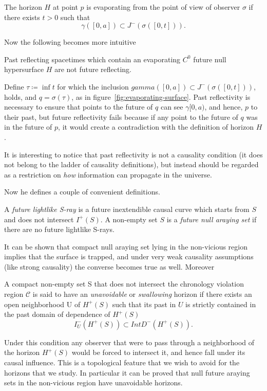 	\begin{definition}
		The horizon \(H\) at point \(p\) is evaporating from the point of view of observer \(\sigma\) if there exists \(t > 0\) such that
		\[
		\gamma \left([0, a]\right) \subset J^-\left(\sigma\left([0, t]\right)\right).	
		\] 
	\end{definition}
	Now the following becomes more intuitive
	\begin{theorem}
		Past reflecting spacetimes which contain an evaporating \(C^0\) future null hypersurface \(H\) are not future reflecting.
	\end{theorem}
	Define \(\tau \coloneqq \inf t\) for which the inclusion \(gamma \left([0, a]\right) \subset J^-\left(\sigma\left([0, t]\right)\right)\), holds, and \(q = \sigma(\tau)\), as in figure~\ref{fig:evaporating-surface}.
	Past reflectivity is necessary to ensure that points to the future of \(q\) can see \(\gamma[0,a)\), and hence, \(p\) to their past, but future reflectivity fails because if any point to the future of \(q\) was in the future of \(p\), it would create a contradiction with the definition of horizon \(H\). 
	\begin{remark}
		It is interesting to notice that past reflectivity is not a causality condition (it does not belong to the ladder of causality definitions), but instead should be regarded as a restriction on \emph{how} information can propagate in the universe.
	\end{remark}

	Now he defines a couple of convenient definitions.
	\begin{definition}
		A \emph{future lightlike S-ray} is a future inextendible causal curve which starts from \(S\) and does not intersect \(I^+(S)\). A non-empty set \(S\) is a \emph{future null araying set} if there are no future lightlike S-rays. 
	\end{definition}
	It can be shown that compact null araying set lying in the non-vicious region implies that the surface is trapped, and under very weak causality assumptions (like strong causality) the converse becomes true as well. Moreover
	\begin{definition}
		A compact non-empty set S that does not intersect the chronology violation region \(\mathcal{C}\) is said to have an \emph{unavoidable} or \emph{swallowing} horizon if there exists an open neighborhood U of \(H^+(S)\) such that its past in \(U\) is strictly contained in the past domain of dependence of \(H^+(S)\) 
		\[
			I^-_U(H^+(S)) \subset Int D^-(H^+(S)).	
		\]
	\end{definition}
	Under this condition any observer that were to pass through a neighborhood of the horizon \(H^+(S)\) would be forced to intersect it, and hence fall under its causal influence. This is a topological feature that we wish to avoid for the horizons that we study. In particular it can be proved that null future araying sets in the non-vicious region have unavoidable horizons.

